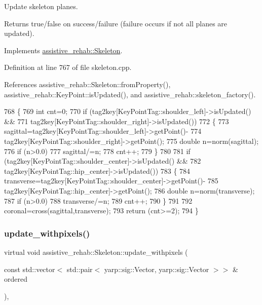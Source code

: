 Update skeleton planes. 

\begin{DoxyReturn}{Returns}
true/false on success/failure (failure occurs if not all planes are updated). 
\end{DoxyReturn}


Implements \hyperlink{classassistive__rehab_1_1Skeleton_af0ee2be195f804a9562cb184a2be0bad}{assistive\+\_\+rehab\+::\+Skeleton}.



Definition at line 767 of file skeleton.\+cpp.



References assistive\+\_\+rehab\+::\+Skeleton\+::from\+Property(), assistive\+\_\+rehab\+::\+Key\+Point\+::is\+Updated(), and assistive\+\_\+rehab\+::skeleton\+\_\+factory().


\begin{DoxyCode}
768 \{
769     \textcolor{keywordtype}{int} cnt=0;
770     \textcolor{keywordflow}{if} (tag2key[KeyPointTag::shoulder\_left]->isUpdated() &&
771         tag2key[KeyPointTag::shoulder\_right]->isUpdated())
772     \{
773         sagittal=tag2key[KeyPointTag::shoulder\_left]->getPoint()-
774                  tag2key[KeyPointTag::shoulder\_right]->getPoint();
775         \textcolor{keywordtype}{double} n=norm(sagittal);
776         \textcolor{keywordflow}{if} (n>0.0)
777             sagittal/=n;
778         cnt++;
779     \}
780 
781     \textcolor{keywordflow}{if} (tag2key[KeyPointTag::shoulder\_center]->isUpdated() &&
782         tag2key[KeyPointTag::hip\_center]->isUpdated())
783     \{
784         transverse=tag2key[KeyPointTag::shoulder\_center]->getPoint()-
785                    tag2key[KeyPointTag::hip\_center]->getPoint();
786         \textcolor{keywordtype}{double} n=norm(transverse);
787         \textcolor{keywordflow}{if} (n>0.0)
788             transverse/=n;
789         cnt++;
790     \}
791 
792     coronal=cross(sagittal,transverse);
793     \textcolor{keywordflow}{return} (cnt>=2);
794 \}
\end{DoxyCode}
\mbox{\label{classassistive__rehab_1_1Skeleton_a20d9eb5aecd6dccfa7e049bb932a6cef}} 
\subsubsection{\texorpdfstring{update\+\_\+withpixels()}{update\_withpixels()}\hspace{0.1cm}{\footnotesize\ttfamily [1/2]}}
{\footnotesize\ttfamily virtual void assistive\+\_\+rehab\+::\+Skeleton\+::update\+\_\+withpixels (\begin{DoxyParamCaption}\item[{const std\+::vector$<$ std\+::pair$<$ yarp\+::sig\+::\+Vector, yarp\+::sig\+::\+Vector $>$$>$ \&}]{ordered }\end{DoxyParamCaption})\hspace{0.3cm}{\ttfamily [virtual]}, {\ttfamily [inherited]}}



